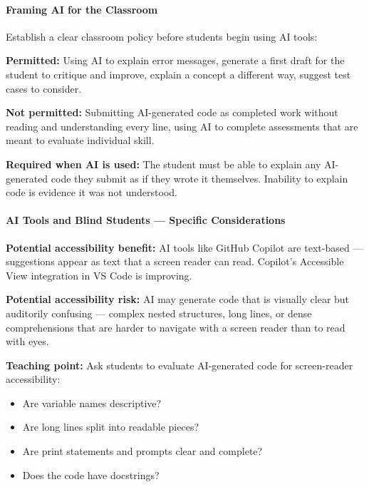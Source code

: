 \documentclass[
  justified,
  openright,
]{tufte-book}
\let\subsubsection\paragraph
\let\paragraph\paragraph
\let\subsubsection\paragraph
\let\paragraph\paragraph
\providecommand{\tightlist}{%
  \setlength{\itemsep}{0pt}\setlength{\parskip}{0pt}}
\begin{document}
\subsubsection{Framing AI for the
Classroom}\label{framing-ai-for-the-classroom}

Establish a clear classroom policy before students begin using AI tools:

\textbf{Permitted:} Using AI to explain error messages, generate a first
draft for the student to critique and improve, explain a concept a
different way, suggest test cases to consider.

\textbf{Not permitted:} Submitting AI-generated code as completed work
without reading and understanding every line, using AI to complete
assessments that are meant to evaluate individual skill.

\textbf{Required when AI is used:} The student must be able to explain
any AI-generated code they submit as if they wrote it themselves.
Inability to explain code is evidence it was not understood.

\subsubsection{AI Tools and Blind Students --- Specific
Considerations}\label{ai-tools-and-blind-students-specific-considerations}

\textbf{Potential accessibility benefit:} AI tools like GitHub Copilot
are text-based --- suggestions appear as text that a screen reader can
read. Copilot's Accessible View integration in VS Code is improving.

\textbf{Potential accessibility risk:} AI may generate code that is
visually clear but auditorily confusing --- complex nested structures,
long lines, or dense comprehensions that are harder to navigate with a
screen reader than to read with eyes.

\textbf{Teaching point:} Ask students to evaluate AI-generated code for
screen-reader accessibility:

\begin{itemize}
\tightlist
\item
  Are variable names descriptive?
\item
  Are long lines split into readable pieces?
\item
  Are print statements and prompts clear and complete?
\item
  Does the code have docstrings?
\end{itemize}
\end{document}
